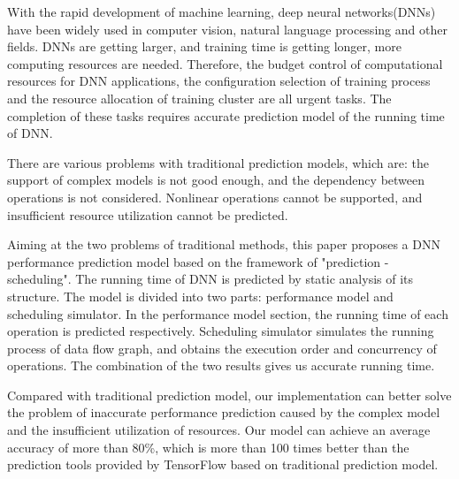 \begin{eabstract}
    With the rapid development of machine learning, deep neural networks(DNNs) have been widely used in computer vision, natural language processing and other fields. DNNs are getting larger, and training time is getting longer, more computing resources are needed. Therefore, the budget control of computational resources for DNN applications, the configuration selection of training process and the resource allocation of training cluster are all urgent tasks. The completion of these tasks requires accurate prediction model of the running time of DNN.

    There are various problems with traditional prediction models, which are: the support of complex models is not good enough, and the dependency between operations is not considered. Nonlinear operations cannot be supported, and insufficient resource utilization cannot be predicted.

    Aiming at the two problems of traditional methods, this paper proposes a DNN performance prediction model based on the framework of "prediction - scheduling". The running time of DNN is predicted by static analysis of its structure. The model is divided into two parts: performance model and scheduling simulator. In the performance model section, the running time of each operation is predicted respectively. Scheduling simulator simulates the running process of data flow graph, and obtains the execution order and concurrency of operations. The combination of the two results gives us accurate running time.

    Compared with traditional prediction model, our implementation can better solve the problem of inaccurate performance prediction caused by the complex model and the insufficient utilization of resources. Our model can achieve an average accuracy of more than 80\%, which is more than 100 times better than the prediction tools provided by TensorFlow based on traditional prediction model.
\end{eabstract}


